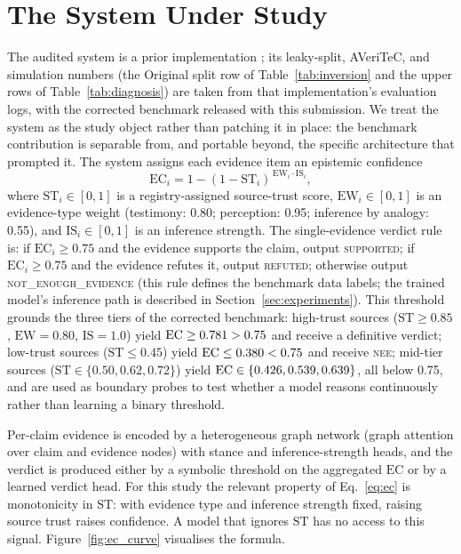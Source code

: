 \documentclass[11pt]{article}
\begin{document}
\section{The System Under Study}
\label{sec:system}
The audited system is a prior implementation \citep{karki2026system}; its leaky-split, AVeriTeC, and simulation numbers (the Original split row of Table~\ref{tab:inversion} and the upper rows of Table~\ref{tab:diagnosis}) are taken from that implementation's evaluation logs, with the corrected benchmark released with this submission. We treat the system as the study object rather than patching it in place: the benchmark contribution is separable from, and portable beyond, the specific architecture that prompted it. The system assigns each evidence item an epistemic confidence
\begin{equation}
\mathrm{EC}_i = 1 - (1 - \mathrm{ST}_i)^{\,\mathrm{EW}_i \cdot \mathrm{IS}_i},
\label{eq:ec}
\end{equation}
where $\mathrm{ST}_i \in [0,1]$ is a registry-assigned source-trust score, $\mathrm{EW}_i \in [0,1]$ is an evidence-type weight (testimony: 0.80; perception: 0.95; inference by analogy: 0.55), and $\mathrm{IS}_i \in [0,1]$ is an inference strength. The single-evidence verdict rule is: if $\mathrm{EC}_i \geq 0.75$ and the evidence supports the claim, output \textsc{supported}; if $\mathrm{EC}_i \geq 0.75$ and the evidence refutes it, output \textsc{refuted}; otherwise output \textsc{not\_enough\_evidence} (this rule defines the benchmark data labels; the trained model's inference path is described in Section~\ref{sec:experiments}). This threshold grounds the three tiers of the corrected benchmark: high-trust sources ($\mathrm{ST}\geq 0.85$, $\mathrm{EW}=0.80$, $\mathrm{IS}=1.0$) yield $\mathrm{EC}\geq 0.781>0.75$ and receive a definitive verdict; low-trust sources ($\mathrm{ST}\leq 0.45$) yield $\mathrm{EC}\leq 0.380<0.75$ and receive \textsc{nee}; mid-tier sources ($\mathrm{ST}\in\{0.50,0.62,0.72\}$) yield $\mathrm{EC}\in\{0.426,0.539,0.639\}$, all below 0.75, and are used as boundary probes to test whether a model reasons continuously rather than learning a binary threshold.

Per-claim evidence is encoded by a heterogeneous graph network \citep{schlichtkrull2018rgcn} (graph attention \citep{velickovic2018gat} over claim and evidence nodes) with stance and inference-strength heads, and the verdict is produced either by a symbolic threshold on the aggregated $\mathrm{EC}$ or by a learned verdict head. For this study the relevant property of Eq.~\eqref{eq:ec} is monotonicity in $\mathrm{ST}$: with evidence type and inference strength fixed, raising source trust raises confidence. A model that ignores $\mathrm{ST}$ has no access to this signal. Figure~\ref{fig:ec_curve} visualises the formula.
\end{document}
